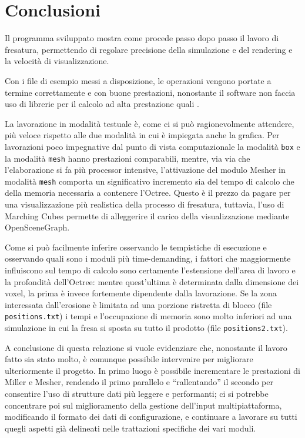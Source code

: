 \section{Conclusioni}
Il programma sviluppato mostra come procede passo dopo passo il lavoro di fresatura, permettendo di regolare precisione della simulazione e del rendering e la velocità di visualizzazione.

Con i file di esempio messi a disposizione, le operazioni vengono portate a termine correttamente e con buone prestazioni, nonostante il software non faccia uso di librerie per il calcolo ad alta prestazione quali \cuda.

La lavorazione in modalità testuale è, come ci si può ragionevolmente attendere, più veloce rispetto alle due modalità in cui è impiegata anche la grafica. Per lavorazioni poco impegnative dal punto di vista computazionale la modalità \texttt{box} e la modalità \texttt{mesh} hanno prestazioni comparabili, mentre, via via che l'elaborazione si fa più processor intensive, l'attivazione del modulo Mesher in modalità \texttt{mesh} comporta un significativo incremento sia del tempo di calcolo che della memoria necessaria a contenere l'Octree. Questo è il prezzo da pagare per una visualizzazione più realistica della processo di fresatura, tuttavia, l'uso di Marching Cubes permette di alleggerire il carico della visualizzazione mediante OpenSceneGraph.

Come si può facilmente inferire osservando le tempistiche di esecuzione e osservando quali sono i moduli più time-demanding, i fattori che maggiormente influiscono sul tempo di calcolo sono certamente l'estensione dell'area di lavoro e la profondità dell'Octree: mentre quest'ultima è determinata dalla dimensione dei voxel, la prima è invece fortemente dipendente dalla lavorazione. Se la zona interessata dall'erosione è limitata ad una porzione ristretta di blocco (file \texttt{positions.txt}) i tempi e l'occupazione di memoria sono molto inferiori ad una simulazione in cui la fresa si sposta su tutto il prodotto (file \texttt{positions2.txt}).

A conclusione di questa relazione si vuole evidenziare che, nonostante il lavoro fatto sia stato molto, è comunque possibile intervenire per migliorare ulteriormente il progetto. In primo luogo è possibile incrementare le prestazioni di Miller e Mesher, rendendo il primo parallelo e ``rallentando'' il secondo per consentire l'uso di strutture dati più leggere e performanti; ci si potrebbe concentrare poi sul miglioramento della gestione dell'input multipiattaforma, modificando il formato dei dati di configurazione, e continuare a lavorare su tutti quegli aspetti già delineati nelle trattazioni specifiche dei vari moduli.

